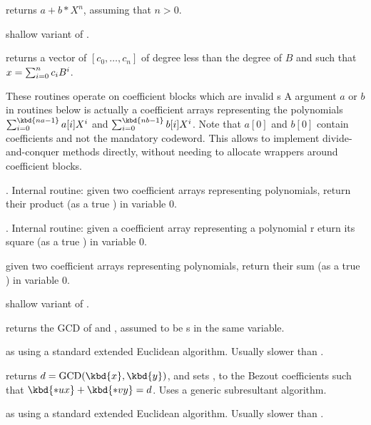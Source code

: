  returns $a + b * X^n$, assuming
that $n > 0$.

 shallow
variant of .

 returns a vector of 
$[c_0,\ldots,c_n]$ of degree less than the degree of $B$ and such that
$x=\sum_{i=0}^{n}{c_i\*B^i}$.


These routines operate on coefficient blocks which are invalid s
A  argument $a$ or $b$ in routines below is actually a coefficient
arrays representing the polynomials
 $\sum_{i = 0}^{\kbd{na-1}} a[i] X^i$ and
 $\sum_{i = 0}^{\kbd{nb-1}} b[i] X^i$. Note that $a[0]$ and $b[0]$ contain
coefficients and not the mandatory  codeword. This allows to implement
divide-and-conquer methods directly, without needing to allocate wrappers
around coefficient blocks.

. Internal routine:
given two coefficient arrays representing polynomials, return their product (as
a true ) in variable $0$.

. Internal routine:
given a coefficient array representing a polynomial r eturn its square (as a
true ) in variable $0$.

given two coefficient arrays representing polynomials, return their sum (as a
true ) in variable $0$.

 shallow
variant of .


 returns the GCD of  and ,
assumed to be s in the same variable.

 as  using a standard
extended Euclidean algorithm. Usually slower than .

 returns
$d = \text{GCD}(\kbd{x},\kbd{y})$, and sets ,  to the Bezout
coefficients such that $\kbd{*ux} + \kbd{*vy} = d$. Uses a generic
subresultant algorithm.

 as
 using a standard extended Euclidean algorithm. Usually
slower than .

